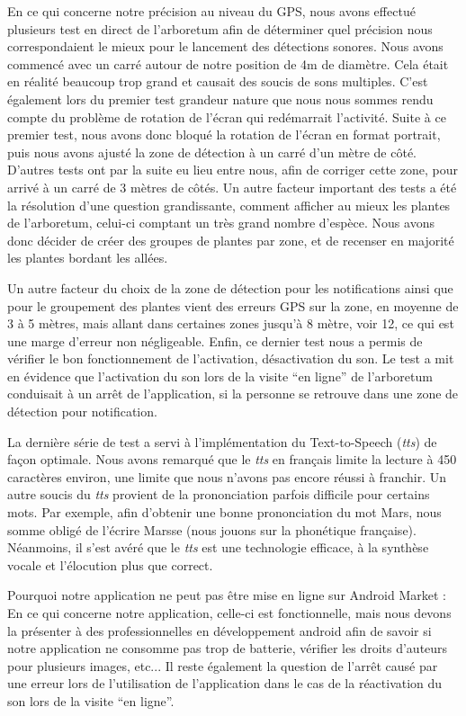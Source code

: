 \documentclass[a4paper,11pt]{article}
\begin{document}
		En ce qui concerne notre précision au niveau du GPS, nous avons effectué plusieurs test en direct de l'arboretum afin de déterminer quel précision nous correspondaient le mieux pour le lancement des détections sonores. Nous avons commencé avec un carré autour de notre	position de 4m de diamètre. Cela était en réalité beaucoup trop grand et causait des soucis de sons multiples. C'est également lors du premier test grandeur nature que nous nous sommes rendu compte du problème de rotation de l'écran qui redémarrait l'activité. Suite à ce premier test, nous avons donc bloqué la rotation de l'écran en format portrait, puis nous avons ajusté la zone de détection à un carré d'un mètre de côté. D'autres tests ont par la suite eu lieu entre nous, afin de corriger cette zone, pour arrivé à un carré de 3 mètres de côtés. Un autre facteur important des tests a été la résolution d'une question grandissante, comment afficher au mieux les plantes de l'arboretum, celui-ci comptant un très grand nombre d'espèce. Nous avons donc décider de créer des groupes de plantes par zone, et de recenser en majorité les plantes bordant les allées. 
		
		Un autre facteur du choix de la zone de détection pour les notifications ainsi que pour le groupement des plantes vient des erreurs GPS sur la zone, en moyenne de 3 à 5 mètres, mais allant dans certaines zones jusqu'à 8 mètre, voir 12, ce qui est une marge d'erreur non négligeable. Enfin, ce dernier test nous a permis de vérifier le bon fonctionnement de l'activation, désactivation du son. Le test a mit en évidence que l'activation du son lors de la visite ``en ligne'' de l'arboretum conduisait à un arrêt de l'application, si la personne se retrouve dans une zone de détection pour notification.
		
		La dernière série de test a servi à l'implémentation du Text-to-Speech (\emph{tts}) de façon optimale. Nous avons remarqué que le \emph{tts} en français limite la lecture à 450 caractères environ, une limite que nous n'avons pas encore réussi à franchir. Un autre soucis du \emph{tts} provient de la prononciation parfois difficile pour certains mots. Par exemple, afin d'obtenir une bonne prononciation du mot Mars, nous somme obligé de l'écrire Marsse (nous jouons sur la phonétique française). Néanmoins, il s'est avéré que le \emph{tts} est une technologie efficace, à la synthèse vocale et l’élocution plus que correct.
		
		Pourquoi notre application ne peut pas être mise en ligne sur Android Market : 
En ce qui concerne notre application, celle-ci est fonctionnelle, mais nous devons la présenter à des professionnelles en développement android afin de savoir si notre application ne consomme pas trop de batterie, vérifier les droits d'auteurs pour plusieurs images, etc... Il reste également la question de l'arrêt causé par une erreur lors de l'utilisation de l'application dans le cas de la réactivation du son lors de la visite ``en ligne''.
\end{document}
